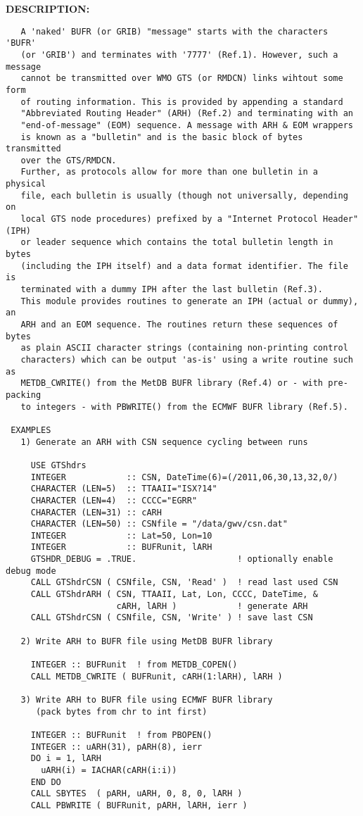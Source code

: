 \textbf{DESCRIPTION:}\hspace{0.08in}\begin{Verbatim}
   A 'naked' BUFR (or GRIB) "message" starts with the characters 'BUFR'
   (or 'GRIB') and terminates with '7777' (Ref.1). However, such a message
   cannot be transmitted over WMO GTS (or RMDCN) links wihtout some form
   of routing information. This is provided by appending a standard
   "Abbreviated Routing Header" (ARH) (Ref.2) and terminating with an
   "end-of-message" (EOM) sequence. A message with ARH & EOM wrappers
   is known as a "bulletin" and is the basic block of bytes transmitted
   over the GTS/RMDCN.
   Further, as protocols allow for more than one bulletin in a physical
   file, each bulletin is usually (though not universally, depending on
   local GTS node procedures) prefixed by a "Internet Protocol Header" (IPH)
   or leader sequence which contains the total bulletin length in bytes
   (including the IPH itself) and a data format identifier. The file is
   terminated with a dummy IPH after the last bulletin (Ref.3).
   This module provides routines to generate an IPH (actual or dummy), an
   ARH and an EOM sequence. The routines return these sequences of bytes
   as plain ASCII character strings (containing non-printing control
   characters) which can be output 'as-is' using a write routine such as
   METDB_CWRITE() from the MetDB BUFR library (Ref.4) or - with pre-packing
   to integers - with PBWRITE() from the ECMWF BUFR library (Ref.5).

 EXAMPLES
   1) Generate an ARH with CSN sequence cycling between runs

     USE GTShdrs
     INTEGER            :: CSN, DateTime(6)=(/2011,06,30,13,32,0/)
     CHARACTER (LEN=5)  :: TTAAII="ISX?14"
     CHARACTER (LEN=4)  :: CCCC="EGRR"
     CHARACTER (LEN=31) :: cARH
     CHARACTER (LEN=50) :: CSNfile = "/data/gwv/csn.dat"
     INTEGER            :: Lat=50, Lon=10
     INTEGER            :: BUFRunit, lARH
     GTSHDR_DEBUG = .TRUE.                    ! optionally enable debug mode
     CALL GTShdrCSN ( CSNfile, CSN, 'Read' )  ! read last used CSN
     CALL GTShdrARH ( CSN, TTAAII, Lat, Lon, CCCC, DateTime, &
                      cARH, lARH )            ! generate ARH
     CALL GTShdrCSN ( CSNfile, CSN, 'Write' ) ! save last CSN

   2) Write ARH to BUFR file using MetDB BUFR library

     INTEGER :: BUFRunit  ! from METDB_COPEN()
     CALL METDB_CWRITE ( BUFRunit, cARH(1:lARH), lARH )

   3) Write ARH to BUFR file using ECMWF BUFR library
      (pack bytes from chr to int first)

     INTEGER :: BUFRunit  ! from PBOPEN()
     INTEGER :: uARH(31), pARH(8), ierr
     DO i = 1, lARH
       uARH(i) = IACHAR(cARH(i:i))
     END DO
     CALL SBYTES  ( pARH, uARH, 0, 8, 0, lARH )
     CALL PBWRITE ( BUFRunit, pARH, lARH, ierr )
\end{Verbatim}
